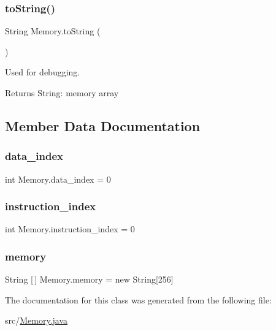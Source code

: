 \subsubsection{\texorpdfstring{to\+String()}{toString()}}
{\footnotesize\ttfamily String Memory.\+to\+String (\begin{DoxyParamCaption}{ }\end{DoxyParamCaption})}

Used for debugging.

\begin{DoxyReturn}{Returns}
String\+: memory array 
\end{DoxyReturn}


\subsection{Member Data Documentation}
\mbox{\label{class_memory_a12ea5f04133e82e0eef1358bc6181747}} 
\subsubsection{\texorpdfstring{data\+\_\+index}{data\_index}}
{\footnotesize\ttfamily int Memory.\+data\+\_\+index = 0\hspace{0.3cm}{\ttfamily [private]}}

\mbox{\label{class_memory_a1a44efd4867dad33ce936039c19ad4aa}} 
\subsubsection{\texorpdfstring{instruction\+\_\+index}{instruction\_index}}
{\footnotesize\ttfamily int Memory.\+instruction\+\_\+index = 0\hspace{0.3cm}{\ttfamily [private]}}

\mbox{\label{class_memory_a3a84ec7ffdcb044c979085e5cc2498cb}} 
\subsubsection{\texorpdfstring{memory}{memory}}
{\footnotesize\ttfamily String \mbox{[}$\,$\mbox{]} Memory.\+memory = new String\mbox{[}256\mbox{]}\hspace{0.3cm}{\ttfamily [private]}}



The documentation for this class was generated from the following file\+:\begin{DoxyCompactItemize}
\item 
src/\mbox{\hyperlink{_memory_8java}{Memory.\+java}}\end{DoxyCompactItemize}
